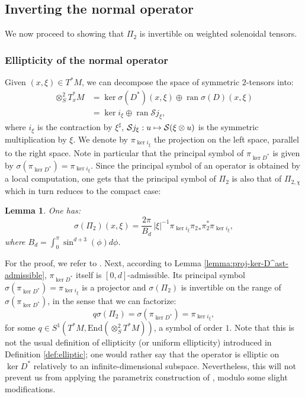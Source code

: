 \documentclass[JEP,XML,SOM,Unicode,NoFloatCountersInSection]{cedram}
\newcommand\mto{\mathchoice{\longmapsto}{\mapsto}{\mapsto}{\mapsto}}
\newcommand{\mc}{\mathcal}
\DeclareMathOperator{\ran}{ran}
\theoremstyle{plain}
\newtheorem{lemma}{Lemma}[section]
\theoremstyle{definition}
\begin{document}
\subsection{Inverting the normal operator}
\label{ssection:inversion}

We now proceed to showing that $\Pi_2$ is invertible on weighted solenoidal tensors.

\subsubsection{Ellipticity of the normal operator}

\label{ssection:uniform-ellipticity}

Given $(x,\xi) \in T^*M$, we can decompose the space of symmetric $2$-tensors into:
\[
\begin{split}
\otimes^2_S T^*_xM & = \ker \sigma(D^*)(x,\xi) \oplus \ran \sigma(D)(x,\xi) \\
& = \ker i_\xi \oplus \ran \mc{S} j_\xi,
\end{split}
\]
where $i_\xi$ is the contraction by $\xi^\sharp$, $\mc{S} j_\xi : u \mto \mc{S}(\xi \otimes u)$ is the symmetric multiplication by $\xi$. We denote by $\pi_{\ker i_\xi}$ the projection on the left space, parallel to the right space. Note in particular that the principal symbol of $\pi_{\ker D^*}$ is given by $\sigma(\pi_{\ker D^*}) = \pi_{\ker i_\xi}$. Since the principal symbol of an operator is obtained by a local computation, one gets that the principal symbol of $\Pi_2$ is also that of $\Pi_{2,\chi}$ which in turn reduces to the compact case:

\begin{lemma}
One has:
\[
\sigma(\Pi_2)(x,\xi) = \dfrac{2\pi}{B_d}\, |\xi|^{-1} \pi_{\ker i_\xi} {\pi_2}_* \pi_2^* \pi_{\ker i_\xi},
\]
where $B_d = \int_0^\pi \sin^{d+3}(\phi) d\phi$.
\end{lemma}

For the proof, we refer to \cite[Th.\,4.4]{Gouezel-Lefeuvre-19}. Next, according to Lemma \ref{lemma:proj-ker-D^ast-admissible}, $\pi_{\ker D^\ast}$ itself is $[0, d]$-admissible. Its principal symbol $\sigma(\pi_{\ker D^\ast}) = \pi_{\ker i_\xi}$ is a projector and $\sigma(\Pi_2)$ is invertible on the range of $\sigma(\pi_{\ker D^\ast})$, in the sense that we can factorize:
\[
q \sigma(\Pi_2) = \sigma(\pi_{\ker D^\ast}) = \pi_{\ker i_\xi},
\]
for some $q \in S^1(T^*M,\mathrm{End}(\otimes^2_S T^*M))$, a symbol of order $1$. Note that this is not the usual definition of ellipticity (or uniform ellipticity) introduced in Definition \ref{def:elliptic}; one would rather say that the operator is elliptic on $\ker D^*$ \ie relatively to an infinite-dimensional subspace. Nevertheless, this will not prevent us from applying the parametrix construction of \cite{Bonthonneau-Lefeuvre-19-1}, modulo some slight modifications.
\end{document}
